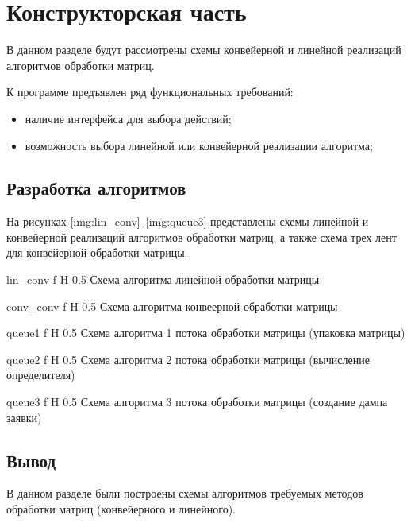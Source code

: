 \chapter{Конструкторская часть}
В данном разделе будут рассмотрены схемы конвейерной и линейной реализаций алгоритмов обработки матриц.

К программе предъявлен ряд функциональных требований:

\begin{itemize}
    \item наличие интерфейса для выбора действий;
    \item возможность выбора линейной или конвейерной реализации алгоритма;
\end{itemize}

\section{Разработка алгоритмов}

На рисунках \ref{img:lin_conv}--\ref{img:queue3} представлены схемы линейной и конвейерной реализаций алгоритмов обработки матриц, а также схема трех лент для конвейерной
обработки матрицы.

{lin_conv} %
{f} %
{H} %
{0.5\textwidth} %
{Схема алгоритма линейной обработки матрицы} %

{conv_conv} %
{f} %
{H} %
{0.5\textwidth} %
{Схема алгоритма конвеерной обработки матрицы} %

{queue1} %
{f} %
{H} %
{0.5\textwidth} %
{Схема алгоритма 1 потока обработки матрицы (упаковка матрицы)} %

{queue2} %
{f} %
{H} %
{0.5\textwidth} %
{Схема алгоритма 2 потока обработки матрицы (вычисление определителя)} %

{queue3} %
{f} %
{H} %
{0.5\textwidth} %
{Схема алгоритма 3 потока обработки матрицы (создание дампа заявки)} %


\section*{Вывод}

В данном разделе были построены схемы алгоритмов требуемых методов
обработки матриц (конвейерного и линейного).

\clearpage
